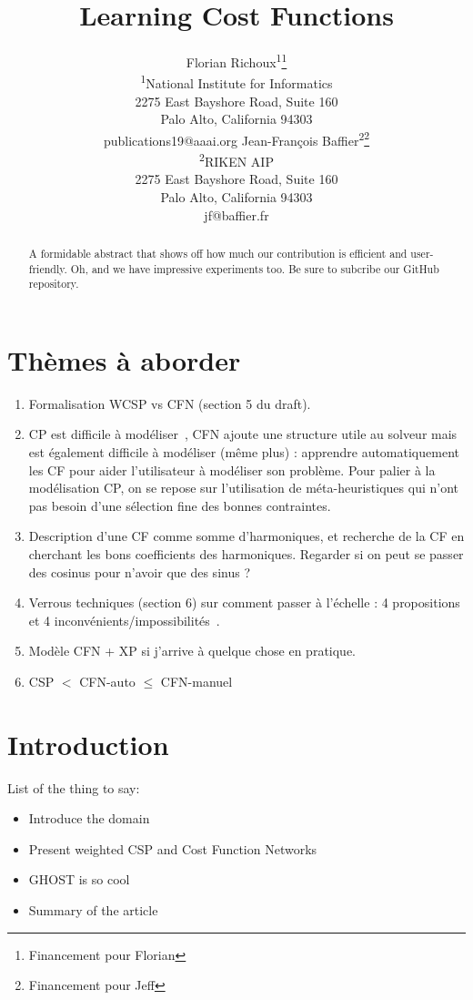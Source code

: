 \documentclass[letterpaper]{article} %
\title{Learning Cost Functions}
\author{Florian Richoux\textsuperscript{\rm 1}\thanks{Financement pour Florian}\\
\textsuperscript{\rm 1}National Institute for Informatics\\ %
2275 East Bayshore Road, Suite 160\\
Palo Alto, California 94303\\
publications19@aaai.org %
\And Jean-Fran\c{c}ois Baffier\textsuperscript{\rm 2}\thanks{Financement pour Jeff}\\
\textsuperscript{\rm 2}RIKEN AIP\\
2275 East Bayshore Road, Suite 160\\
Palo Alto, California 94303\\
jf@baffier.fr %
}
\begin{document}
\maketitle

\begin{abstract}
A formidable abstract that shows off how much our contribution is efficient and user-friendly. Oh, and we have impressive experiments too. Be sure to subcribe our GitHub repository.
\end{abstract}

\section{Thèmes à aborder}

\begin{enumerate}
\item     Formalisation    WCSP     vs    CFN     (section    5     du
  draft). \cite{Bessiere2011,LK2014}
\item CP est difficile à modéliser~\cite{Puget2004,Wallace2003}, CFN ajoute une structure utile au
  solveur  mais est  également  difficile à  modéliser  (même plus)  :
  apprendre  automatiquement   les  CF  pour  aider   l'utilisateur  à
  modéliser  son problème.  Pour palier  à la  modélisation CP,  on se
  repose sur  l'utilisation de méta-heuristiques qui  n'ont pas besoin
  d'une sélection fine des bonnes contraintes. \cite{AMJFH2011,Bessiere2015}
\item Description d'une CF comme  somme d'harmoniques, et recherche de
  la CF en  cherchant les bons coefficients  des harmoniques. Regarder
  si on peut se passer des cosinus pour n'avoir que des sinus ?
\item Verrous techniques (section 6)  sur comment passer à l'échelle :
  4 propositions et 4 inconvénients/impossibilités~\cite{PR2005}.
\item Modèle CFN + XP si j'arrive à quelque chose en pratique. \cite{Hoos2005}
\item CSP $<$ CFN-auto $\leq$ CFN-manuel
\end{enumerate}

\section{Introduction}\label{sec:introduction}
List of the thing to say:
\begin{itemize}
  \item Introduce the domain
  \item Present weighted CSP and Cost Function Networks
  \item GHOST is so cool
  \item Summary of the article
\end{itemize}
\end{document}
